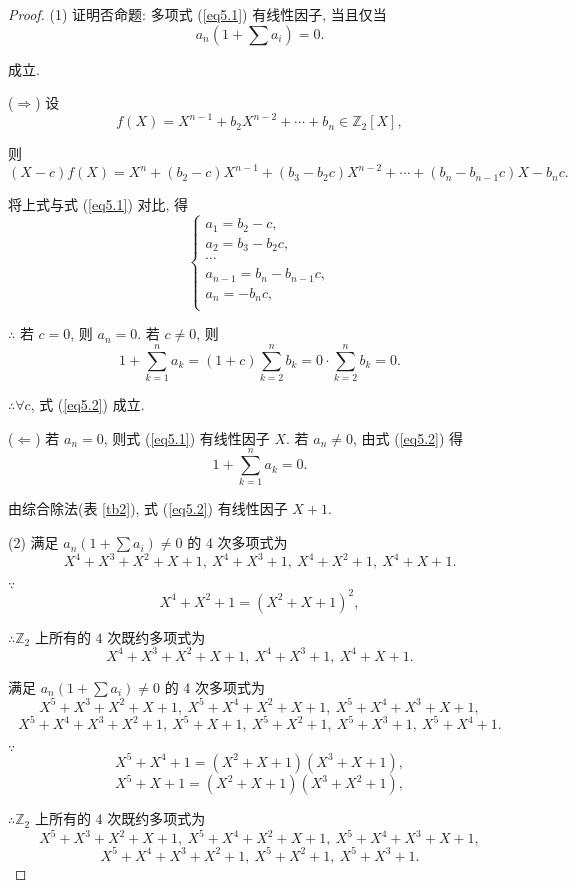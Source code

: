 \documentclass[color=black,device=normal,lang=cn,mode=geye]{elegantnote}
\begin{document}
\begin{proof}
    (1) 证明否命题: 多项式 (\ref{eq5.1}) 有线性因子, 当且仅当
    \begin{equation}\label{eq5.2}
        a_n(1+\sum a_i)=0.
    \end{equation}
    
    成立.

    ($\Rightarrow$) 设
    \[f(X)=X^{n-1}+b_2X^{n-2}+\cdots+b_n\in\mathbb{Z}_2[X],\]

    则
    \[(X-c)f(X)=X^n+(b_2-c)X^{n-1}+(b_3-b_2c)X^{n-2}+\cdots+(b_n-b_{n-1}c)X-b_nc.\]

    将上式与式 (\ref{eq5.1}) 对比, 得
    \[\begin{cases}
        a_1=b_2-c, \\
        a_2=b_3-b_2c, \\
        \cdots \\
        a_{n-1}=b_n-b_{n-1}c, \\
        a_n=-b_nc, \\
    \end{cases}\]

    $\therefore$ 若 $c=0$, 则 $a_n=0$. 若 $c\neq0$, 则
    \[1+\sum\limits_{k=1}^na_k=(1+c)\sum\limits_{k=2}^nb_k=0\cdot\sum\limits_{k=2}^nb_k=0.\]

    $\therefore\forall c$, 式 (\ref{eq5.2}) 成立.

    ($\Leftarrow$) 若 $a_n=0$, 则式 (\ref{eq5.1}) 有线性因子 $X$. 若 $a_n\neq0$, 由式 (\ref{eq5.2}) 得
    \[1+\sum\limits_{k=1}^na_k=0.\]

    由综合除法(表 \ref{tb2}), 式 (\ref{eq5.2}) 有线性因子 $X+1$.

    (2) 满足 $a_n(1+\sum a_i)\neq0$ 的 4 次多项式为
    \[X^4+X^3+X^2+X+1,\ X^4+X^3+1,\ X^4+X^2+1,\ X^4+X+1.\]

    $\because$
    \[X^4+X^2+1=(X^2+X+1)^2,\]

    $\therefore\mathbb{Z}_2$ 上所有的 $4$ 次既约多项式为
    \[X^4+X^3+X^2+X+1,\ X^4+X^3+1,\ X^4+X+1.\]

    满足 $a_n(1+\sum a_i)\neq0$ 的 4 次多项式为
    \[X^5+X^3+X^2+X+1,\ X^5+X^4+X^2+X+1,\ X^5+X^4+X^3+X+1,\]
    \[X^5+X^4+X^3+X^2+1,\ X^5+X+1,\ X^5+X^2+1,\ X^5+X^3+1,\ X^5+X^4+1.\]

    $\because$
    \[X^5+X^4+1=(X^2+X+1)(X^3+X+1),\]
    \[X^5+X+1=(X^2+X+1)(X^3+X^2+1),\]

    $\therefore\mathbb{Z}_2$ 上所有的 $4$ 次既约多项式为
    \[X^5+X^3+X^2+X+1,\ X^5+X^4+X^2+X+1,\ X^5+X^4+X^3+X+1,\]
    \[X^5+X^4+X^3+X^2+1,\ X^5+X^2+1,\ X^5+X^3+1.\]
\end{proof}
\end{document}
